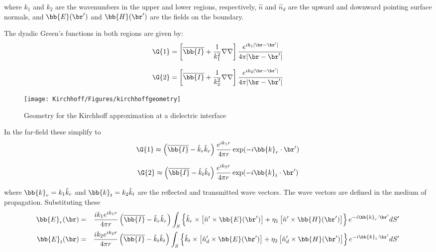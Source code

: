 \noindent where $k_1$ and $k_2$ are the wavenumbers in the upper and lower regions, respectively, $\hat{n}$ and $\hat{n}_d$ are the upward and downward pointing surface normals, and $\bb{E}(\br')$ and $\bb{H}(\br')$ are the fields on the boundary.  


The dyadic Green's functions in both regions are given by:
\begin{equation}
\G{1} = \left[ \overline{\bb{I}} + \dfrac{1}{k_1^2}\nabla\nabla\right] \dfrac{e^{ik_1\vert \br - \br'\vert}}{4\pi \vert \br - \br'\vert}
\end{equation}

\begin{equation}
\G{2} = \left[ \overline{\bb{I}} + \dfrac{1}{k_2^2}\nabla\nabla\right] \dfrac{e^{ik_2\vert \br - \br'\vert}}{4\pi \vert \br - \br'\vert}
\end{equation}



\begin{figure}[h] 
   \centering
   \texttt{[image: Kirchhoff/Figures/kirchhoffgeometry]} 
   \caption{Geometry for the Kirchhoff approximation at a dielectric interface}
     \label{kirchhoffgeo}
\end{figure}


In the far-field these simplify to
\begin{equation}
\G{1} \approx \left( \overline{\bb{I}} - \hat{k}_r \hat{k}_r \right) \dfrac{e^{ik_1r}}{4\pi r} \exp(-i \bb{k}_r \cdot \br') 
\end{equation}

\begin{equation}
\G{2} \approx \left( \overline{\bb{I}} - \hat{k}_t \hat{k}_t \right) \dfrac{e^{ik_2r}}{4\pi r} \exp(-i \bb{k}_t \cdot \br') 
\end{equation}

\noindent where $\bb{k}_r = k_1\hat{k}_r$ and $\bb{k}_t = k_2 \hat{k}_t$ are the reflected and transmitted wave vectors. The wave vectors are defined in the medium of propagation.  Substituting these
\begin{eqnarray}
\bb{E}_r(\br) & = & \dfrac{ik_1 e^{ik_1 r}}{4\pi r} \left( \overline{\bb{I}} - \hat{k}_r \hat{k}_r \right)  \int_S \left\{ \hat{k}_r \times \left[ \hat{n}' \times \bb{E}(\br')\right] + \eta_1\left[ \hat{n}' \times \bb{H}(\br')\right]\right\} e^{-i \bb{k}_r \cdot \br'} dS'   \\
\bb{E}_t(\br) & = & \dfrac{ik_2e^{ik_2r}}{4\pi r} \left( \overline{\bb{I}} - \hat{k}_t \hat{k}_t \right)  \int_S \left\{ \hat{k}_t \times \left[ \hat{n}_d' \times \bb{E}(\br')\right] + \eta_2\left[ \hat{n}_d' \times \bb{H}(\br')\right]\right\} e^{-i \bb{k}_t \cdot \br'}  dS'  
\end{eqnarray}

